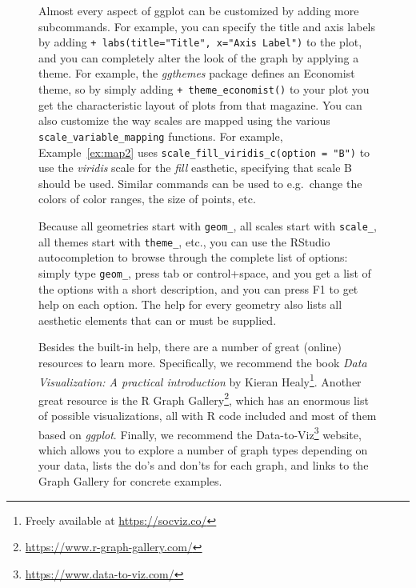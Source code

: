 \begin{figure}
\begin{feature}
Almost every aspect of ggplot can be customized by adding more subcommands.
For example, you can specify the title and axis labels by adding \verb|+ labs(title="Title", x="Axis Label")| to the plot,
and you can completely alter the look of the graph by applying a theme.
For example, the \emph{ggthemes} package defines an Economist theme, so by simply adding \verb|+ theme_economist()| to your plot you get the characteristic layout of plots from that magazine.
You can also customize the way scales are mapped using the various \texttt{scale\_variable\_mapping} functions.
For example, Example~\ref{ex:map2} uses \verb|scale_fill_viridis_c(option = "B")| to use the \emph{viridis} scale for the \emph{fill} easthetic, specifying that scale B should be used. Similar commands can be used to e.g.\ change the colors of color ranges, the size of points, etc.

Because all geometries start with \verb|geom_|, all scales start with \verb|scale_|, all themes start with \verb|theme_|, etc.,
you can use the RStudio autocompletion to browse through the complete list of options:
simply type \verb|geom_|, press tab or control+space, and you get a list of the options with a short description, and you can press F1 to get help on each option. The help for every geometry also lists all aesthetic elements that can or must be supplied.

\nocite{healy2018data}

Besides the built-in help, there are a number of great (online) resources to learn more. Specifically, we recommend the book \emph{Data Visualization: A practical introduction} by Kieran Healy\footnote{Freely available at \url{https://socviz.co/}}. Another great resource is the R Graph Gallery\footnote{\url{https://www.r-graph-gallery.com/}}, which has an enormous list of possible visualizations, all with R code included and most of them based on \emph{ggplot}. Finally, we recommend the Data-to-Viz\footnote{\url{https://www.data-to-viz.com/}} website, which allows you to explore a number of graph types depending on your data, lists the do's and don'ts for each graph, and links to the Graph Gallery for concrete examples.
\end{feature}
\end{figure}


